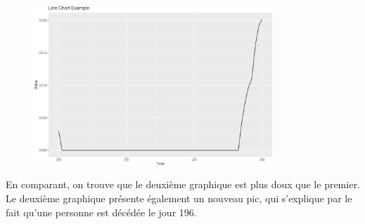 \documentclass[../main.tex]{subfiles}
\begin{document}
\begin{CJK*}{UTF8}{gbsn}
\begin{figure}[H]
  \centering
  \includegraphics[width=0.8\textwidth]{3D.JPG}
  \label{fig:mesh1}
\end{figure}

En comparant, on trouve que le deuxième graphique est plus doux que le premier.
Le deuxième graphique présente également un nouveau pic, 
qui s'explique par le fait qu'une personne est décédée le jour 196.

\end{CJK*}
\end{document}
